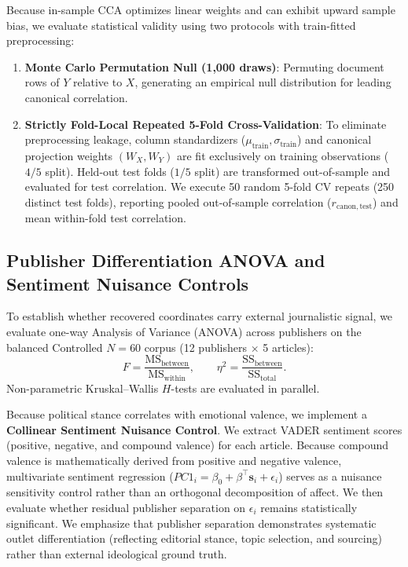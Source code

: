 Because in-sample CCA optimizes linear weights and can exhibit upward sample bias, we evaluate statistical validity using two protocols with train-fitted preprocessing:
\begin{enumerate}
    \item \textbf{Monte Carlo Permutation Null (1,000 draws)}: Permuting document rows of $Y$ relative to $X$, generating an empirical null distribution for leading canonical correlation.
    \item \textbf{Strictly Fold-Local Repeated 5-Fold Cross-Validation}: To eliminate preprocessing leakage, column standardizers ($\mu_{\text{train}}, \sigma_{\text{train}}$) and canonical projection weights $(W_X, W_Y)$ are fit exclusively on training observations ($4/5$ split). Held-out test folds ($1/5$ split) are transformed out-of-sample and evaluated for test correlation. We execute 50 random 5-fold CV repeats (250 distinct test folds), reporting pooled out-of-sample correlation ($r_{\mathrm{canon,test}}$) and mean within-fold test correlation.
\end{enumerate}

\subsection{Publisher Differentiation ANOVA and Sentiment Nuisance Controls}
\label{sec:meth_anova}

To establish whether recovered coordinates carry external journalistic signal, we evaluate one-way Analysis of Variance (ANOVA) across publishers on the balanced Controlled $N=60$ corpus (12 publishers $\times$ 5 articles):
\begin{equation}
    F = \frac{\mathrm{MS}_{\text{between}}}{\mathrm{MS}_{\text{within}}}, \qquad \eta^2 = \frac{\mathrm{SS}_{\text{between}}}{\mathrm{SS}_{\text{total}}}.
\end{equation}
Non-parametric Kruskal--Wallis $H$-tests are evaluated in parallel.

Because political stance correlates with emotional valence, we implement a \textbf{Collinear Sentiment Nuisance Control}. We extract VADER sentiment scores (positive, negative, and compound valence) for each article. Because compound valence is mathematically derived from positive and negative valence, multivariate sentiment regression ($PC1_i = \beta_0 + \beta^\top \mathbf{s}_i + \epsilon_i$) serves as a nuisance sensitivity control rather than an orthogonal decomposition of affect. We then evaluate whether residual publisher separation on $\epsilon_i$ remains statistically significant. We emphasize that publisher separation demonstrates systematic outlet differentiation (reflecting editorial stance, topic selection, and sourcing) rather than external ideological ground truth.

